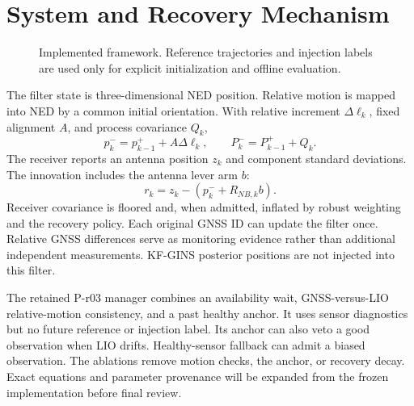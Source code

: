 \documentclass[conference]{IEEEtran}
\begin{document}
\section{System and Recovery Mechanism}
\begin{figure}[t]
\centering
{}
\caption{Implemented framework. Reference trajectories and injection labels are used only for explicit initialization and offline evaluation.}
\end{figure}
The filter state is three-dimensional NED position. Relative motion is mapped into NED by a common initial orientation. With relative increment $\Delta\ell_k$, fixed alignment $A$, and process covariance $Q_k$,
\begin{equation}p_k^-=p_{k-1}^++A\Delta\ell_k,\qquad P_k^-=P_{k-1}^++Q_k.\end{equation}
The receiver reports an antenna position $z_k$ and component standard deviations. The innovation includes the antenna lever arm $b$:
\begin{equation}r_k=z_k-(p_k^-+R_{NB,k}b).\end{equation}
Receiver covariance is floored and, when admitted, inflated by robust weighting and the recovery policy. Each original GNSS ID can update the filter once. Relative GNSS differences serve as monitoring evidence rather than additional independent measurements. KF-GINS posterior positions are not injected into this filter.

The retained P-r03 manager combines an availability wait, GNSS-versus-LIO relative-motion consistency, and a past healthy anchor. It uses sensor diagnostics but no future reference or injection label. Its anchor can also veto a good observation when LIO drifts. Healthy-sensor fallback can admit a biased observation. The ablations remove motion checks, the anchor, or recovery decay. Exact equations and parameter provenance will be expanded from the frozen implementation before final review.
\end{document}
